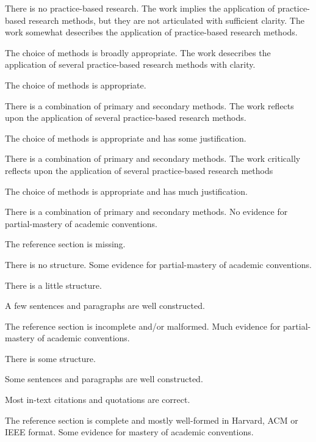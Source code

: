 \documentclass{../../fal_assignment}
\begin{document}
\begin{markingrubric}
        \grade\fail There is no practice-based research.
        \grade The work implies the application of practice-based research methods, but they are not articulated with sufficient clarity.
        \grade The work somewhat desecribes the application of practice-based research methods.
            \par The choice of methods is broadly appropriate.
        \grade The work desecribes the application of several practice-based research methods with clarity.
            \par The choice of methods is appropriate.
            \par There is a combination of primary and secondary methods.
        \grade The work reflects upon the application of several practice-based research methods.
            \par The choice of methods is appropriate and has some justification.
            \par There is a combination of primary and secondary methods.
        \grade The work critically reflects upon the application of several practice-based research methods 
            \par The choice of methods is appropriate and has much justification.
            \par There is a combination of primary and secondary methods.
%
        \grade\fail No evidence for partial-mastery of academic conventions.
        \par The reference section is missing.
        \par There is no structure.
        \grade 	Some evidence for partial-mastery of academic conventions.
            \par There is a little structure.
            \par A few sentences and paragraphs are well constructed.
            \par 	The reference section is incomplete and/or malformed.
        \grade Much evidence for partial-mastery of academic conventions.
        \par There is some structure.
            \par Some sentences and paragraphs are well constructed.
        \par Most in-text citations and quotations are correct.
        \par The reference section is complete and mostly well-formed in Harvard, ACM or IEEE format.
        \grade Some evidence for mastery of academic conventions.

\end{markingrubric}
\end{document}
